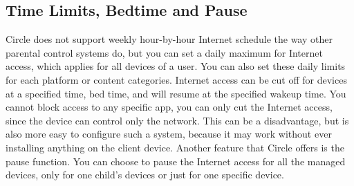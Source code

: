 \subsection{Time Limits, Bedtime and Pause}

Circle does not support weekly hour-by-hour Internet schedule the way other parental control systems do, but you can set a daily maximum for Internet access, which applies for all devices of a user. You can also set these daily limits for each platform or content categories. Internet access can be cut off for devices at a specified time, bed time, and will resume at the specified wakeup time. You cannot block access to any specific app, you can only cut the Internet access, since the device can control only the network. This can be a disadvantage, but is also more easy to configure such a system, because it may work without ever installing anything on the client device. Another feature that Circle offers is the pause function. You can choose to pause the Internet access for all the managed devices, only for one child's devices or just for one specific device.

